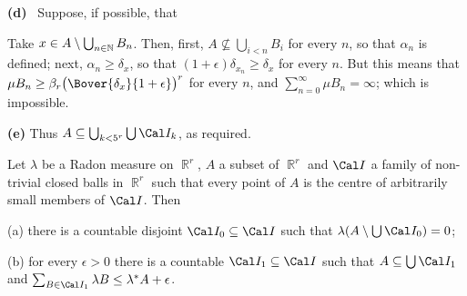 {\medskip

{\bf (d)} \Quer\ Suppose, if possible, that


\noindent Take $x\in A\setminus\bigcup_{n\in\Bbb N}B_n$.   Then, first,
$A\not\subseteq\bigcup_{i<n}B_i$ for every $n$, so that $\alpha_n$ is
defined;  next, $\alpha_n\ge\delta_x$, so that
$(1+\epsilon)\delta_{x_n}\ge\delta_x$ for every $n$.   But this means
that $\mu B_n\ge\beta_r\bigl(\Bover{\delta_x}{1+\epsilon}\bigr)^r$
for every $n$, and $\sum_{n=0}^{\infty}\mu B_n=\infty$;  which is
impossible.\ \Bang

\medskip

{\bf (e)} Thus $A\subseteq\bigcup_{k<5^r}\bigcup\Cal I_k$, as required.
}%

 Let $\lambda$ be a Radon measure on
$\BbbR^r$, $A$ a subset of $\BbbR^r$ and $\Cal I$ a family of
non-trivial closed
balls in $\BbbR^r$ such that every point of $A$ is the centre of
arbitrarily small members of $\Cal I$.   Then

(a) there is a countable disjoint $\Cal I_0\subseteq\Cal I$ such that
$\lambda(A\setminus\bigcup\Cal I_0)=0$;

(b) for every $\epsilon>0$ there is a countable
$\Cal I_1\subseteq\Cal I$ such that $A\subseteq\bigcup\Cal I_1$ and
$\sum_{B\in\Cal I_1}\lambda B\le\lambda^*A+\epsilon$.

